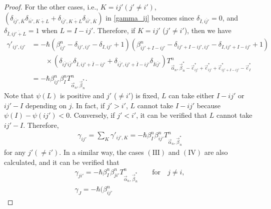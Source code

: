 \documentclass[pdftex]{sigma}
\numberwithin{equation}{section}
\begin{document}
\begin{proof}
For the other cases, i.e.,
$
 K
 =
 ij'
 (
 j'
 \neq
 i'
 )
$,
$
 (
 \delta_{
 \overline{ij'},
 \overline{K}
 }
 \delta_{
 \overline{ii'},
 \overline{K+L}
 }
 +
 \delta_{
 \overline{ij'},
 \overline{K+L}
 }
 \delta_{
 \overline{ii'},
 \overline{K}
 }
 )
$
in \eqref{gamma_ij} becomes
since
$
 \delta_{
 \overline{I},
 \overline{ij'}
 }
 =
 0
$,
and
$
 \delta_{
 \overline{I},
 \overline{ij'+L}
 }
 =
 1
$
when $L=I-ij'$. Therefore, if
$
 K
 =
 ij'$
 ($
 j'
 \neq
 i'
 $),
then we have
\begin{align*}
 \gamma'_{ij',ij'}
 &
 =
 -
 \hbar
 (
 \beta_{ij'}^{n}
 -
 \delta_{ij',ij'}
 -
 \delta_{I,ij'}
 +
 1
 )
 (
 \beta_{ij'+I-ij'}^{n}
 -
 \delta_{ij'+I-ij',ij'}
 -
 \delta_{I,ij'+I-ij'}
 +
 1
 )
 \nonumber
 \\
 &
 \qquad
 \times
 (
 \delta_{
 \overline{ij'}
 \overline{ij'}
 }
 \delta_{
 \overline{I},
 \overline{ij'+I-ij'}
 }
 +
 \delta_{
 \overline{ij'},
 \overline{ij'+I-ij'}
 }
 \delta_{
 \overline{I}
 \overline{ij'}
 }
 )
 T^{n}_{\vec{\alpha}_{n},\vec{\beta}_{n}^{\ast}-\vec{e}_{ij'}^{\ast}+\vec{e}_{ij'}^{\ast}+\vec{e}_{ij'+I-ij'}^{\ast}-\vec{e}_{I}^{\ast}}
 \\
 &=
 - \hbar
 \beta_{ij'}^{n}
 \beta_{I}^{n}
 T^{n}_{\vec{\alpha}_{n},\vec{\beta}_{n}^{\ast}}.
\end{align*}
Note that $\psi(L)$ is positive and
$
j'
$
($
\neq
i'
$)
is fixed, $L$ can take either $I-ij'$ or $ij'-I$ depending on $j$. In fact, if $j'>i'$, $L$ cannot take $I-ij'$ because $\psi(I)-\psi(ij')<0$. Conversely, if $j'<i'$, it can be verified that $L$ cannot take $ij'-I$. Therefore,
\begin{align}
 \gamma_{ij'}
 =
 \sum_{K}
 \gamma'_{ij',K}
 =
 -
 \hbar
 \beta_{I}^{n}
 \beta_{ij'}^{n}
 T^{n}_{\vec{\alpha}_{n},\vec{\beta}_{n}^{\ast}}
 \label{rec_rel_gene_3rdterm_2}
\end{align}
for
any
$
j'
(
\neq
i'
)
$. In a similar way, the cases $(\textrm{III})$ and $(\textrm{IV})$ are also calculated, and it can be verified that
\begin{gather}
 \gamma_{ji'}
 =
 -
 \hbar
 \beta_{I}^{n}
 \beta_{ji'}^{n}
 T^{n}_{\vec{\alpha}_{n},\vec{\beta}_{n}^{\ast}}
 \qquad
 \textrm{for}
\quad
 j
 \neq
 i
 ,
 \label{rec_rel_gene_3rdterm_3}
 \\
 \gamma_{J}
 =
 -
 \hbar
 (
 \beta_{ij'}^{n}

\end{gather}
\end{proof}
\end{document}
